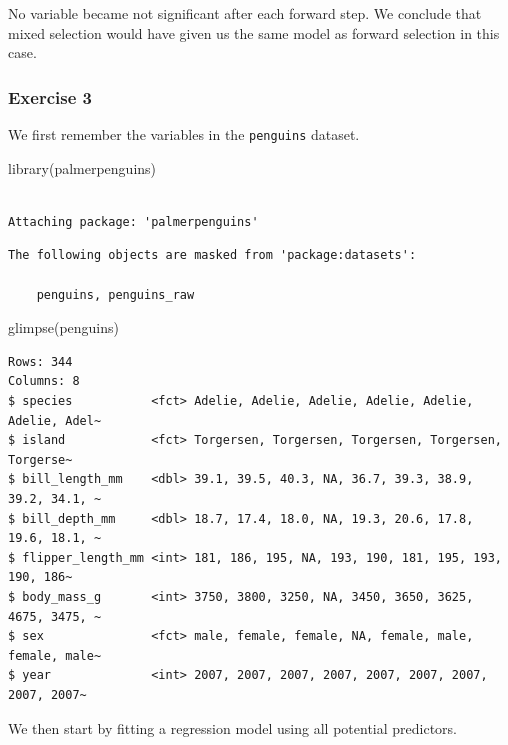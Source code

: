 \documentclass[
  letterpaper,
  DIV=11,
  numbers=noendperiod]{scrreprt}
\newenvironment{Shaded}{\begin{snugshade}}{\end{snugshade}}
\newcommand{\FunctionTok}[1]{\textcolor[rgb]{0.28,0.35,0.67}{#1}}
\newcommand{\NormalTok}[1]{\textcolor[rgb]{0.00,0.23,0.31}{#1}}
\begin{document}
No variable became not significant after each forward step. We conclude
that mixed selection would have given us the same model as forward
selection in this case.

\subsubsection{Exercise 3}\label{exercise-3-21}

We first remember the variables in the \texttt{penguins} dataset.

\begin{Shaded}
\begin{Highlighting}[]
\FunctionTok{library}\NormalTok{(palmerpenguins)}
\end{Highlighting}
\end{Shaded}

\begin{verbatim}

Attaching package: 'palmerpenguins'
\end{verbatim}

\begin{verbatim}
The following objects are masked from 'package:datasets':

    penguins, penguins_raw
\end{verbatim}

\begin{Shaded}
\begin{Highlighting}[]
\FunctionTok{glimpse}\NormalTok{(penguins)}
\end{Highlighting}
\end{Shaded}

\begin{verbatim}
Rows: 344
Columns: 8
$ species           <fct> Adelie, Adelie, Adelie, Adelie, Adelie, Adelie, Adel~
$ island            <fct> Torgersen, Torgersen, Torgersen, Torgersen, Torgerse~
$ bill_length_mm    <dbl> 39.1, 39.5, 40.3, NA, 36.7, 39.3, 38.9, 39.2, 34.1, ~
$ bill_depth_mm     <dbl> 18.7, 17.4, 18.0, NA, 19.3, 20.6, 17.8, 19.6, 18.1, ~
$ flipper_length_mm <int> 181, 186, 195, NA, 193, 190, 181, 195, 193, 190, 186~
$ body_mass_g       <int> 3750, 3800, 3250, NA, 3450, 3650, 3625, 4675, 3475, ~
$ sex               <fct> male, female, female, NA, female, male, female, male~
$ year              <int> 2007, 2007, 2007, 2007, 2007, 2007, 2007, 2007, 2007~
\end{verbatim}

We then start by fitting a regression model using all potential
predictors.
\end{document}
